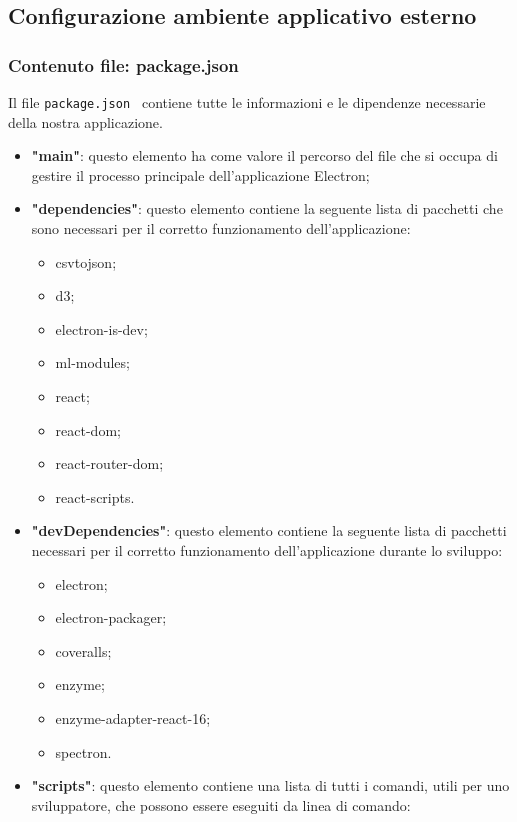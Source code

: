 \subsection{Configurazione ambiente applicativo esterno}
\subsubsection{Contenuto file: package.json}
Il file \verb|package.json | contiene tutte le informazioni e le dipendenze necessarie della nostra applicazione.
\begin{itemize}
    \item \textbf{"main"}: questo elemento ha come valore il percorso del file che si occupa di gestire il processo principale dell'applicazione Electron;
    \item \textbf{"dependencies"}: questo elemento contiene la seguente lista di pacchetti che sono necessari per il corretto funzionamento dell'applicazione:
        \begin{itemize}
            \item csvtojson;
            \item d3;
            \item electron-is-dev;
            \item ml-modules;
            \item react;
            \item react-dom;
            \item react-router-dom;
            \item react-scripts.
        \end{itemize}
    \item \textbf{"devDependencies"}: questo elemento contiene la seguente lista di pacchetti necessari per il corretto funzionamento dell'applicazione durante lo sviluppo:
        \begin{itemize}
            \item electron;
            \item electron-packager;
            \item coveralls;
            \item enzyme;
            \item enzyme-adapter-react-16;
            \item spectron.
        \end{itemize} 
    \item \textbf{"scripts"}: questo elemento contiene una lista di tutti i comandi, utili per uno sviluppatore, che possono essere eseguiti da linea di comando:

\end{itemize}
